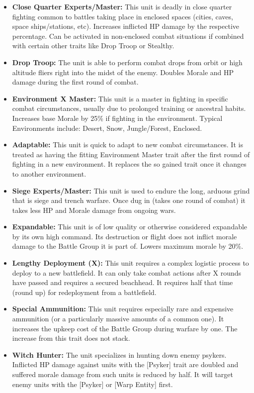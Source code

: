 \begin{itemize}
 	\item \textbf{Close Quarter Experts/Master:} This unit is deadly in close quarter fighting common to battles taking place in enclosed spaces (cities, caves, space ships/stations, etc). Increases inflicted HP damage by the respective percentage. Can be activated in non-enclosed combat situations if combined with certain other traits like Drop Troop or Stealthy.
 	\item \textbf{Drop Troop:} The unit is able to perform combat drops from orbit or high altitude fliers right into the midst of the enemy. Doubles Morale and HP damage during the first round of combat.
 	\item \textbf{Environment X Master:} This unit is a master in fighting in specific combat circumstances, usually due to prolonged training or ancestral habits. Increases base Morale by 25\% if fighting in the environment. Typical Environments include: Desert, Snow, Jungle/Forest, Enclosed.
 	\item \textbf{Adaptable:} This unit is quick to adapt to new combat circumstances. It is treated as having the fitting Environment Master trait after the first round of fighting in a new environment. It replaces the so gained trait once it changes to another environment.
 	\item \textbf{Siege Experts/Master:} This unit is used to endure the long, arduous grind that is siege and trench warfare. Once dug in (takes one round of combat) it takes less HP and Morale damage from ongoing wars.
 	\item \textbf{Expandable:} This unit is of low quality or otherwise considered expandable by its own high command. Its destruction or flight does not inflict morale damage to the Battle Group it is part of. Lowers maximum morale by 20\%.
 	\item \textbf{Lengthy Deployment (X):} This unit requires a complex logistic process to deploy to a new battlefield. It can only take combat actions after X rounds have passed and requires a secured beachhead. It requires half that time (round up) for redeployment from a battlefield. 
 	\item \textbf{Special Ammunition:} This unit requires especially rare and expensive ammunition (or a particularly massive amounts of a common one). It increases the upkeep cost of the Battle Group during warfare by one. The increase from this trait does not stack.
 	\item \textbf{Witch Hunter:} The unit specializes in hunting down enemy psykers. Inflicted HP damage against units with the [Psyker] trait are doubled and suffered morale damage from such units is reduced by half. It will target enemy units with the [Psyker] or [Warp Entity] first.

\end{itemize}
